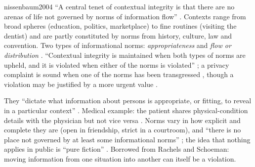\begin{papercard}{nissenbaum2004}
 ``A central tenet of contextual integrity is that there are no arenas of life not governed by norms of information flow'' . Contexts range from broad spheres (education, politics, marketplace) to fine routines (visiting the dentist) and are partly constituted by norms from history, culture, law and convention. Two types of informational norms: \emph{appropriateness} and \emph{flow or distribution} . ``Contextual integrity is maintained when both types of norms are upheld, and it is violated when either of the norms is violated'' ; a privacy complaint is sound when one of the norms has been transgressed , though a violation may be justified by a more urgent value .

 They ``dictate what information about persons is appropriate, or fitting, to reveal in a particular context'' . Medical example: the patient shares physical-condition details with the physician but not vice versa . Norms vary in how explicit and complete they are (open in friendship, strict in a courtroom), and ``there is no place not governed by at least some informational norms'' ; the idea that nothing applies in public is ``pure fiction'' . Borrowed from Rachels and Schoeman: moving information from one situation into another can itself be a violation.


\end{papercard}
